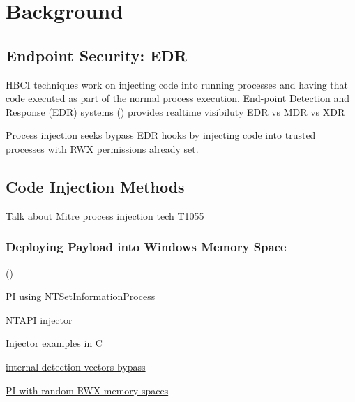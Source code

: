 
\section{Background}

\subsection{Endpoint Security: EDR}

HBCI techniques work on injecting code into running processes and having that code executed as part of the normal process execution.  End-point Detection and Response (EDR) systems (\cite{Hayes:2023}) provides realtime visibiluty
\href{https://www.crowdstrike.com/cybersecurity-101/endpoint-security/edr-vs-mdr-vs-xdr/}{EDR vs MDR vs XDR}

Process injection seeks bypass EDR hooks by injecting code into trusted processes with RWX permissions already set.

\subsection{Code Injection Methods}

Talk about Mitre process injection tech T1055 \cite{Mitre:2017}

\subsubsection{Deploying Payload into Windows Memory Space}


(\cite{Zhan:2018})

\href{https://www.riskinsight-wavestone.com/en/2023/10/process-injection-using-ntsetinformationprocess/}{PI using NTSetInformationProcess}

\href{https://github.com/elddy/Windows-NTAPI-Injector}{NTAPI injector} 

\href{https://gist.github.com/WKL-Sec/96e17188e4c159c2cdf7ff2c111130cc#file-local-c}{Injector examples in C}

\href{https://www.unknowncheats.me/forum/anti-cheat-bypass/286274-internal-detection-vectors-bypass.html}{internal detection vectors bypass}

\href{https://medium.com/@s12deff/process-injection-with-random-rwx-memory-spaces-3e3651149527}{PI with random RWX memory spaces}
